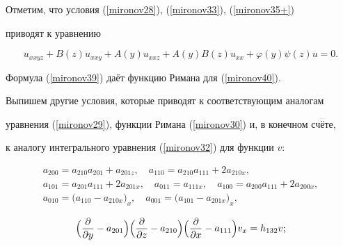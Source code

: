 Отметим, что условия (\ref{mironov28}), (\ref{mironov33}), (\ref{mironov35+})


приводят к уравнению


\begin{equation}\label{mironov40}


u_{xxyz}+B(z)u_{xxy}+A(y)u_{xxz}+A(y)B(z)u_{xx}+\varphi(y)\psi(z)u=0.


\end{equation}


Формула (\ref{mironov39}) даёт функцию Римана для (\ref{mironov40}).





Выпишем другие условия, которые приводят к соответствующим аналогам


уравнения (\ref{mironov29}), функции Римана (\ref{mironov30}) и, в конечном счёте,


к аналогу интегрального уравнения (\ref{mironov32}) для функции $v$:


\begin{equation}\label{mironov41}


\begin{array}{c}


a_{200}=a_{210}a_{201}+a_{201z},\quad


a_{110}=a_{210}a_{111}+2a_{210x},\\


a_{101}=a_{201}a_{111}+2a_{201x},\quad a_{011}=a_{111x},\quad


a_{100}=a_{200}a_{111}+2a_{200x},\\


a_{010}=\bigl(a_{110}-a_{210x}\bigr)_{x},\quad a_{001}=\bigl(a_{101}-a_{201x}\bigr)_{x},


\end{array}


\end{equation}


$$


\Bigl ( \frac{\partial}{\partial y}-a_{201} \Bigr )


\Bigl ( \frac{\partial}{\partial z}-a_{210} \Bigr )


\Bigl ( \frac{\partial}{\partial x}-a_{111} \Bigr )


v_{x} = h_{132}v;


$$





